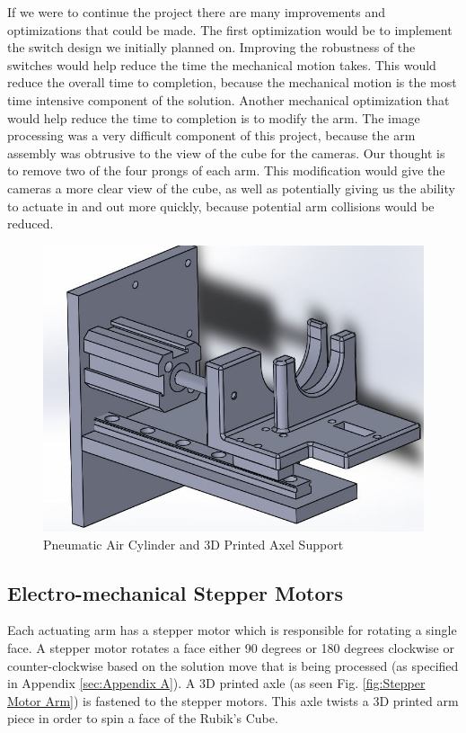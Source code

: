 \documentclass[final, letterpaper, 10 pt, conference, twocolumn]{IEEEtran}
\begin{document}
If we were to continue the project there are many improvements and optimizations that could be made. The first optimization would be to implement the switch design we initially planned on.  Improving the robustness of the switches would help reduce the time the mechanical motion takes. This would reduce the overall time to completion, because the mechanical motion is the most time intensive component of the solution. 
Another mechanical optimization that would help reduce the time to completion is to modify the arm.  The image processing was a very difficult component of this project, because the arm assembly was obtrusive to the view of the cube for the cameras.  Our thought is to remove two of the four prongs of each arm.  This modification would give the cameras a more clear view of the cube, as well as potentially giving us the ability to actuate in and out more quickly, because potential arm collisions would be reduced.

\begin{figure}[!ht]
\centering
\includegraphics[scale=0.28]{AirCylinder.jpg}
\caption{Pneumatic Air Cylinder and 3D Printed Axel Support}
\label{fig:Pneumatic Air Cylinder}
\end{figure}

\subsection{Electro-mechanical Stepper Motors}
\label{sec:Stepper Motors}
Each actuating arm has a stepper motor which is responsible for rotating a single face. A stepper motor rotates a face either 90 degrees or 180 degrees clockwise or counter-clockwise based on the solution move that is being processed (as specified in Appendix \ref{sec:Appendix A}). A 3D printed axle (as seen Fig. \ref{fig:Stepper Motor Arm}) is fastened to the stepper motors. This axle twists a 3D printed arm piece in order to spin a face of the Rubik's Cube.
\end{document}
